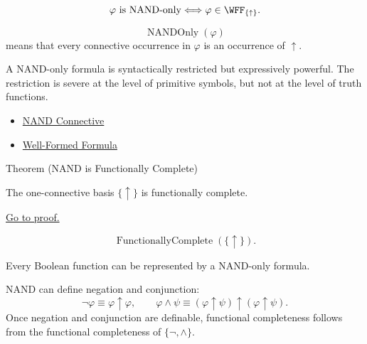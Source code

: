 \begin{remark*}
\[
\varphi\text{ is NAND-only}
\Longleftrightarrow
\varphi\in\WFF_{\{\uparrow\}}.
\]
\end{remark*}

\begin{remark*}
\[
  \operatorname{NANDOnly}(\varphi)
\] means that every connective occurrence in
\(\varphi\) is an occurrence of \(\uparrow\).
\end{remark*}

\begin{remark*}[Interpretation]
A NAND-only formula is syntactically restricted but expressively powerful. The
restriction is severe at the level of primitive symbols, but not at the level of
truth functions.
\end{remark*}

\begin{dependencies}
\begin{itemize}
  \item \hyperref[def:nand-connective-propositional-logic]{NAND Connective}
  \item \hyperref[def:well-formed-formula]{Well-Formed Formula}
\end{itemize}
\end{dependencies}

\begin{theorembox}{Theorem (NAND is Functionally Complete)}
\begin{theorem}
\label{thm:nand-functionally-complete-propositional-logic}
The one-connective basis \(\{\uparrow\}\) is functionally complete.

\noindent\hyperref[prf:nand-functionally-complete-propositional-logic]{Go to proof.}
\end{theorem}
\end{theorembox}

\begin{remark*}
\[
\operatorname{FunctionallyComplete}(\{\uparrow\}).
\]
\end{remark*}



\begin{remark*}[Interpretation]
Every Boolean function can be represented by a NAND-only formula.

NAND can define negation and conjunction:
\[
\neg\varphi\equiv\varphi\uparrow\varphi,
\qquad
\varphi\land\psi\equiv(\varphi\uparrow\psi)\uparrow(\varphi\uparrow\psi).
\]
Once negation and conjunction are definable, functional completeness follows
from the functional completeness of \(\{\neg,\land\}\).
\end{remark*}

